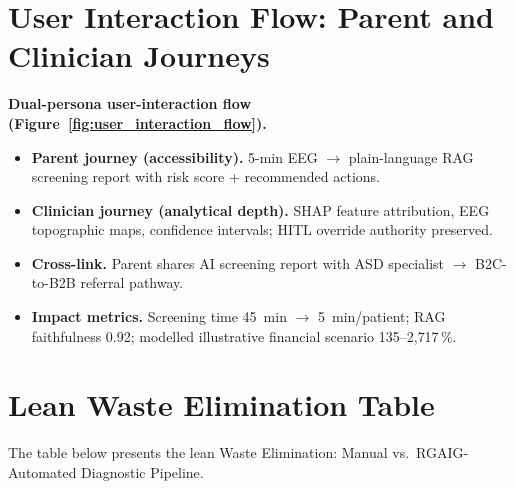 

\section{User Interaction Flow: Parent and Clinician Journeys}
\label{sec:appendix_ch5_user_flow}

\noindent\textbf{Dual-persona user-interaction flow (Figure~\ref{fig:user_interaction_flow}).}
\begin{itemize}[leftmargin=*, itemsep=2pt]
    \item \textbf{Parent journey (accessibility).} 5-min EEG $\to$ plain-language RAG screening report with risk score + recommended actions.
    \item \textbf{Clinician journey (analytical depth).} SHAP feature attribution, EEG topographic maps, confidence intervals; HITL override authority preserved.
    \item \textbf{Cross-link.} Parent shares AI screening report with ASD specialist $\to$ B2C-to-B2B referral pathway.
    \item \textbf{Impact metrics.} Screening time 45~min $\to$ 5~min/patient; RAG faithfulness 0.92; modelled illustrative financial scenario 135--2{,}717\,\%.
\end{itemize}






\section*{Lean Waste Elimination Table}
\label{sec:app_ch5_tab_lean_waste}
\noindent The table below presents the lean Waste Elimination: Manual vs.\ RGAIG-Automated Diagnostic Pipeline.

